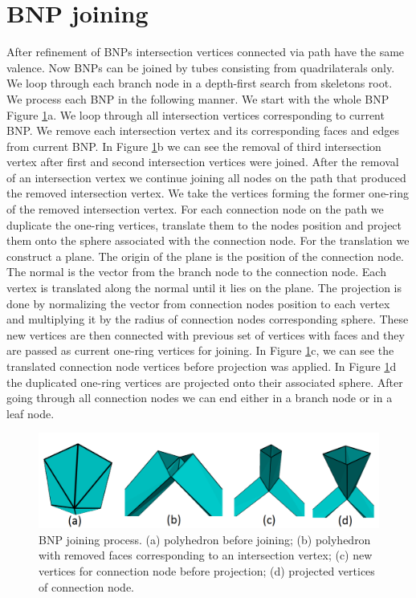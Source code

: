 \section{BNP joining}\label{sec:bnp_join}
After refinement of BNPs intersection vertices connected via path have the same valence. Now BNPs can be joined by tubes consisting from quadrilaterals only. We loop through each branch node in a depth-first search from skeletons root. We process each BNP in the following manner. We start with the whole BNP Figure \ref{fig:joining_process_ilu}a. We loop through all intersection vertices corresponding to current BNP. We remove each intersection vertex and its corresponding faces and edges from current BNP. In Figure \ref{fig:joining_process_ilu}b we can see the removal of third intersection vertex after first and second intersection vertices were joined. After the removal of an intersection vertex we continue joining all nodes on the path that produced the removed intersection vertex. We take the vertices forming the former one-ring of the removed intersection vertex. For each connection node on the path we duplicate the one-ring vertices, translate them to the nodes position and project them onto the sphere associated with the connection node. For the translation we construct a plane. The origin of the plane is the position of the connection node. The normal is the vector from the branch node to the connection node. Each vertex is translated along the normal until it lies on the plane. The projection is done by normalizing the vector from connection nodes position to each vertex and multiplying it by the radius of connection nodes corresponding sphere. These new vertices are then connected with previous set of vertices with faces and they are passed as current one-ring vertices for joining. In Figure \ref{fig:joining_process_ilu}c, we can see the translated connection node vertices before projection was applied. In Figure \ref{fig:joining_process_ilu}d the duplicated one-ring vertices are projected onto their associated sphere. After going through all connection nodes we can end either in a branch node or in a leaf node.

\begin{figure}[h]
    \centering
    \includegraphics[width=\textwidth]{images/joining_ilu.png}
    \caption[BNP joining process]{BNP joining process. (a) polyhedron before joining; (b) polyhedron with removed faces corresponding to an intersection vertex; (c) new vertices for connection node before projection; (d) projected vertices of connection node.}
    \label{fig:joining_process_ilu}
\end{figure}

